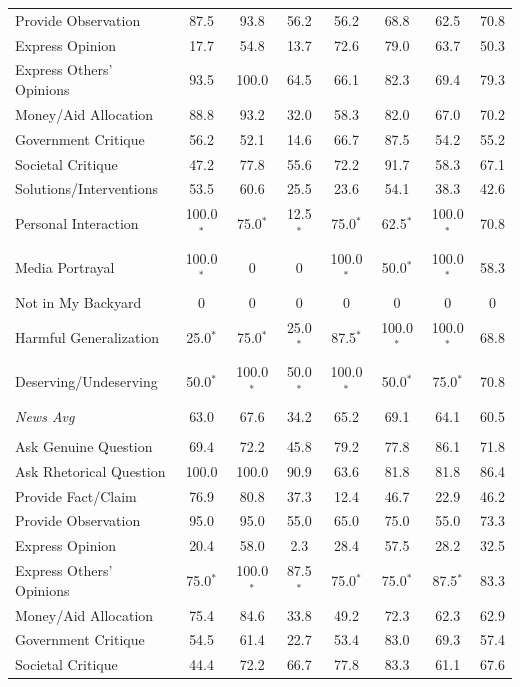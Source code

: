 \begin{table}[htbp]
{\begin{tabular}{lccccccc}
Provide Observation & 87.5 & 93.8 & 56.2 & 56.2 & 68.8 & 62.5 & 70.8 \\
Express Opinion & 17.7 & 54.8 & 13.7 & 72.6 & 79.0 & 63.7 & 50.3 \\
Express Others' Opinions & 93.5 & 100.0 & 64.5 & 66.1 & 82.3 & 69.4 & 79.3 \\
Money/Aid Allocation & 88.8 & 93.2 & 32.0 & 58.3 & 82.0 & 67.0 & 70.2 \\
Government Critique & 56.2 & 52.1 & 14.6 & 66.7 & 87.5 & 54.2 & 55.2 \\
Societal Critique & 47.2 & 77.8 & 55.6 & 72.2 & 91.7 & 58.3 & 67.1 \\
Solutions/Interventions & 53.5 & 60.6 & 25.5 & 23.6 & 54.1 & 38.3 & 42.6 \\
Personal Interaction & 100.0$^*$ & 75.0$^*$ & 12.5$^*$ & 75.0$^*$ & 62.5$^*$ & 100.0$^*$ & 70.8 \\
Media Portrayal & 100.0$^*$ & 0 & 0 & 100.0$^*$ & 50.0$^*$ & 100.0$^*$ & 58.3 \\
Not in My Backyard & 0 & 0 & 0 & 0 & 0 & 0 & 0 \\
Harmful Generalization & 25.0$^*$ & 75.0$^*$ & 25.0$^*$ & 87.5$^*$ & 100.0$^*$ & 100.0$^*$ & 68.8 \\
Deserving/Undeserving & 50.0$^*$ & 100.0$^*$ & 50.0$^*$ & 100.0$^*$ & 50.0$^*$ & 75.0$^*$ & 70.8 \\
\midrule
\textit{News Avg} & 63.0 & 67.6 & 34.2 & 65.2 & 69.1 & 64.1 & 60.5 \\
\addlinespace[0.4em]
\multicolumn{8}{l}{\textit{Meeting Minutes}} \\
Ask Genuine Question & 69.4 & 72.2 & 45.8 & 79.2 & 77.8 & 86.1 & 71.8 \\
Ask Rhetorical Question & 100.0 & 100.0 & 90.9 & 63.6 & 81.8 & 81.8 & 86.4 \\
Provide Fact/Claim & 76.9 & 80.8 & 37.3 & 12.4 & 46.7 & 22.9 & 46.2 \\
Provide Observation & 95.0 & 95.0 & 55.0 & 65.0 & 75.0 & 55.0 & 73.3 \\
Express Opinion & 20.4 & 58.0 & 2.3 & 28.4 & 57.5 & 28.2 & 32.5 \\
Express Others' Opinions & 75.0$^*$ & 100.0$^*$ & 87.5$^*$ & 75.0$^*$ & 75.0$^*$ & 87.5$^*$ & 83.3 \\
Money/Aid Allocation & 75.4 & 84.6 & 33.8 & 49.2 & 72.3 & 62.3 & 62.9 \\
Government Critique & 54.5 & 61.4 & 22.7 & 53.4 & 83.0 & 69.3 & 57.4 \\
Societal Critique & 44.4 & 72.2 & 66.7 & 77.8 & 83.3 & 61.1 & 67.6 \\

\end{tabular}}
\end{table}
